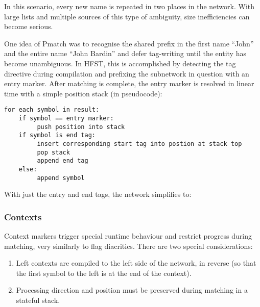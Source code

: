 \documentclass{llncs}
\begin{document}
In this scenario, every new name is repeated in two places in the network. With
large lists and multiple sources of this type of ambiguity, size inefficiencies
can become serious.

One idea of Pmatch was to recognise the shared prefix in the first name ``John''
and the entire name ``John Bardin'' and defer tag-writing until the entity
has become unambiguous. In HFST, this is accomplished by detecting the tag directive
during compilation and prefixing the subnetwork in question with an entry marker.
After matching is complete, the entry marker is resolved in linear time with
a simple position stack (in pseudocode):

\begin{verbatim}
for each symbol in result:
    if symbol == entry marker:
         push position into stack
    if symbol is end tag:
         insert corresponding start tag into postion at stack top
         pop stack
         append end tag
    else:
         append symbol
\end{verbatim}

With just the entry and end tags, the network simplifies to:


\subsubsection{Contexts}

Context markers trigger special runtime behaviour and restrict
progress during matching, very similarly to flag diacritics.
There are two special considerations:

\begin{enumerate}
\item Left contexts are compiled to the left side of the network, in reverse
(so that the first symbol to the left is at the end of the context).
\item Processing direction and position must be preserved during
matching in a stateful stack.
\end{enumerate}
\end{document}
